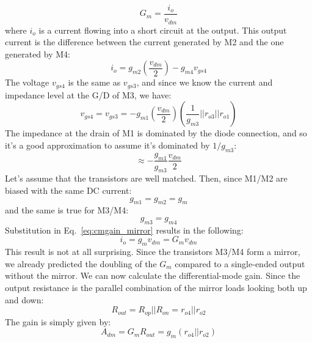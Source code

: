     \begin{equation}
        {G_m} = \frac{{{i_o}}}{{{v_{dm}}}}
    \end{equation}
where $i_o$ is a current flowing into a short circuit at the output.  This output current is the difference between the current generated by M2 and the one generated by M4:
    \begin{equation}
        {i_o} = {g_{m2}}\left( {\frac{{{v_{dm}}}}{2}} \right) - {g_{m4}}{v_{gs4}}
        \label{eq:cmgain_mirror}
    \end{equation}
The voltage $v_{gs4}$ is the same as $v_{gs3}$, and since we know the current and impedance level at the G/D of M3, we have:
    \begin{equation}
        {v_{gs4}} = {v_{gs3}} =  - {g_{m1}}\left( {\frac{{{v_{dm}}}}{2}} \right)\left( {\frac{1}{{{g_{m3}}}}||{r_{o3}}||{r_{o1}}} \right) 
    \end{equation}
The impedance at the drain of M1 is dominated by the diode connection, and so it's a good approximation to assume it's dominated by $1/g_{m3}$:
    \begin{equation}
        \approx  - \frac{{{g_{m1}}}}{{{g_{m3}}}}\frac{{{v_{dm}}}}{2}
    \end{equation}
Let's assume that the transistors are well matched.  Then, since M1/M2 are biased with the same DC current:
    \begin{equation}
        {g_{m1}} = {g_{m2}} = {g_m}
    \end{equation}
and the same is true for M3/M4:
    \begin{equation}
        {g_{m3}} = {g_{m4}}
    \end{equation}
Substitution in Eq.~\ref{eq:cmgain_mirror} results in the following:
    \begin{equation}
        {i_o} = {g_m}{v_{dm}} = G_m v_{dm}
    \end{equation}
This result is not at all surprising.  Since the transistors M3/M4 form a mirror, we already predicted the doubling of the $G_m$ compared to a single-ended output without the mirror.
We can now calculate the differential-mode gain.  Since the output resistance is the parallel combination of the mirror loads looking both up and down:
    \begin{equation}
        {R_{out}} = {R_{op}}||{R_{on}} = {r_{o4}}||{r_{o2}}
    \end{equation}
The gain is simply given by:
    \begin{equation}
        {A_{dm}} = {G_m}{R_{out}} = {g_m}\left( {{r_{o4}}||{r_{o2}}} \right)
    \end{equation}
